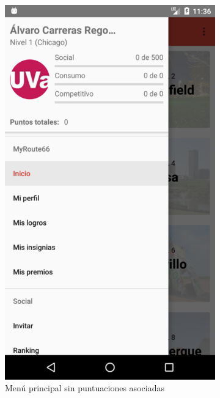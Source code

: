 \documentclass[twoside]{report}
\begin{document}
\begin{figure}[H]
\begin{center}
\begin{subfigure}[t]{.3\linewidth}
		\includegraphics[scale=0.25]{images/userguide/2.png}
		\caption{Menú principal sin puntuaciones asociadas}
	\end{subfigure}\hspace{3mm}%
	\begin{subfigure}[t]{.3\linewidth}

\end{subfigure}
\end{center}
\end{figure}
\end{document}
